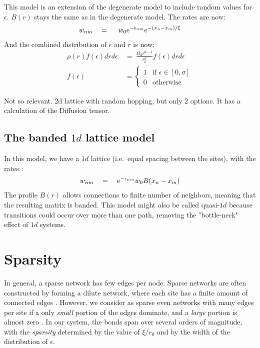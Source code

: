 This model is an extension of the degenerate model to include
random values for $\epsilon$. $B(r)$ stays the same as in the degenerate model.
The rates are now:
%
\begin{align}\label{eq:mott_hopping_rates}
w_{nm} \quad = \quad \ w_0 \mbox{e}^{-\epsilon_{nm}}\mbox{e}^{-(x_n-x_m)/\xi}
\end{align}
%
And the combined distribution of $\epsilon$ and $r$ is now:
%
\begin{align}\label{eq:mott_distribution}
\rho(r)f(\epsilon)drd\epsilon \ &=\ \frac{\Omega_d r^{d-1}}{r_0^d} f(\epsilon) dr d\epsilon \\
f(\epsilon)\ &= 
  \begin{cases} 
    1 &\textrm{if   } \epsilon \in [0,\sigma] \\
    0 &\textrm{otherwise}
  \end{cases}
\end{align}
%

Not so relevant. 2d lattice with random hopping, but only 2 options. It has a calculation of the Diffusion tensor.
\subsection{The banded $1d$ lattice model}\label{sec:banded}

In this model, we have a $1d$ lattice (i.e.\ equal spacing between the sites), 
with the rates :
%
\begin{align}
w_{nm} \quad = \quad \mbox{e}^{-\epsilon_{nm}}w_0 B(x_n-x_m)
\end{align}
%
The profile $B(r)$ allows connections to finite number of neighbors,
meaning that the resulting matrix is banded. This model might also
be called quasi-$1d$ because transitions could occur over more
than one path, removing the "bottle-neck" effect of $1d$ systems.




\section{Sparsity}\label{sec:sparsity}

In general, a sparse network has few edges per node. Sparse networks 
are often constructed by forming a dilute network, where each site
has a finite amount of connected edges 
\cite{rodgers_density_1988,biroli_single_1999,fortin_asymptotic_2005,metz_localization_2010}.
However, we consider as sparse even networks with many edges per site
if a only \emph{small} portion of the edges dominate, and a \emph{large}
portion is almost zero \cite{cohen_energy_2012,stotland_semilinear_2009}. In our system, the bonds span
over several orders of magnitude, with the \emph{sparsity} 
determined by the value of $\xi/r_0$ and by the width of the distribution
of $\epsilon$.

